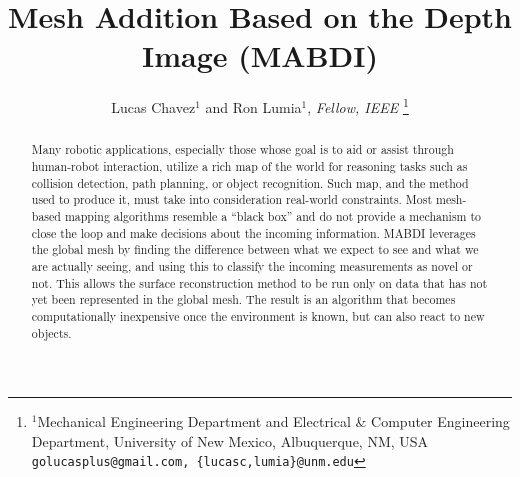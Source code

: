 \documentclass[letterpaper, 10pt, conference, final]{ieeeconf}  %
\title{\LARGE \bf
Mesh Addition Based on the Depth Image (MABDI)
}
\author{Lucas Chavez$^{1}$ and Ron Lumia$^{1}$, \textit{Fellow, IEEE}%
\thanks{$^{1}$Mechanical Engineering Department and Electrical \& Computer Engineering Department, University of New Mexico,
	Albuquerque, NM, USA
        {\tt\small golucasplus@gmail.com, \{lucasc,lumia\}@unm.edu}}%
}%
\begin{document}
\setlength{\textheight}{9.0in} %

\maketitle
\thispagestyle{empty}
\pagestyle{empty}

\setlength{\topmargin}{0.0in}  %
\setlength{\textheight}{9.2in} %

\begin{abstract}


Many robotic applications, especially those whose goal is to aid or assist
through human-robot interaction, utilize a rich map of the world for reasoning
tasks such as collision detection, path planning, or object recognition. Such
map, and the method used to produce it, must take into consideration real-world
constraints. Most mesh-based mapping algorithms resemble a ``black box'' and do
not provide a mechanism to close the loop and make decisions about the
incoming information. MABDI leverages the global mesh by finding the difference
between what we expect to see and what we are actually seeing, and using this to
classify the incoming measurements as novel or not. This allows the surface
reconstruction method to be run only on data that has not yet been represented in
the global mesh. The result is an algorithm that becomes computationally
inexpensive once the environment is known, but can also react to new objects.


\end{abstract}



\vspace{-5pt}








\end{document}
